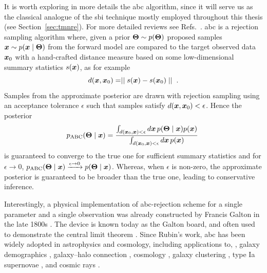 It is worth exploring in more details the \gls*{abc} algorithm, since it will serve us as the classical analogue of the \gls*{sbi} technique mostly employed throughout this thesis (see Section~\ref{sec:tmnre}). For more detailed reviews see Refs.~\cite{marin2012approximate, Sisson:2018aa, Grazian:2019aa}. \Gls*{abc} is a rejection sampling algorithm where, given a prior $\bm{\Theta}\sim p(\bm{\Theta})$ proposed samples $\bm{x} \sim p(\bm{x}\mid\bm{\Theta})$ from the forward model are compared to the target observed data $\bm{x}_0$ with a hand-crafted distance measure based on some low-dimensional summary statistics $s(\bm{x})$, as for example
\begin{equation}
    d(\bm{x}, \bm{x}_0)  = \mid\mid s(\bm{x}) - s(\bm{x}_0)\mid\mid\;.
\end{equation}
Samples from the approximate posterior are drawn with rejection sampling using an acceptance tolerance $\epsilon$ such that samples satisfy $d(\bm{x}, \bm{x}_0) < \epsilon$.
Hence the posterior
\begin{equation}
    p_\text{ABC}(\bm{\Theta}\mid\bm{x}) = \frac
    {\int_{d(\bm{x}_0, \bm{x}) < \epsilon} d\bm{x}\, p(\bm{\Theta}\mid\bm{x})p(\bm{x})}
    {\int_{d(\bm{x}_0, \bm{x}) < \epsilon} d\bm{x}\, p(\bm{x})} \;
\end{equation}
is guaranteed to converge to the true one for sufficient summary statistics and for $\epsilon \to 0$, $p_\text{ABC}(\bm{\Theta}\mid\bm{x}) \xrightarrow{\epsilon \to 0} p(\bm{\Theta}\mid\bm{x})$. Whereas, when $\epsilon$ is non-zero, the approximate posterior is guaranteed to be broader than the true one, leading to conservative inference. 

Interestingly, a physical implementation of \gls*{abc}-rejection scheme for a single parameter and a single observation was already constructed by Francis Galton in the late 1800s \cite[Figure 5]{stigler2010darwin}. The device is known today as the Galton board, and often used to demonstrate the central limit theorem \cite{galton1889natural}. Since Rubin's work, \gls*{abc} has been widely adopted in astrophysics and cosmology, including applications to, \eg, galaxy demographics \cite{cameron2012approximate}, galaxy–halo connection \cite{hahn2017approximate}, cosmology \cite{Akeret:2015uha}, galaxy clustering \cite{Ishida:2015wla}, type Ia supernovae \cite{Weyant:2012xe}, and cosmic rays \cite{bourriche2024beyond}.

